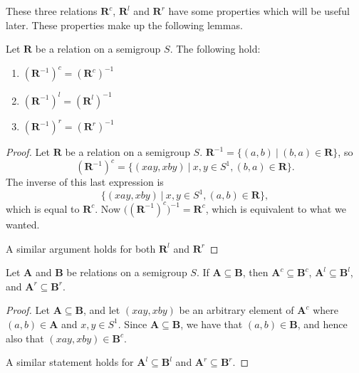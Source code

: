 These three relations $\mathbf{R}^c$, $\mathbf{R}^l$ and $\mathbf{R}^r$ have
some properties which will be useful later.  These properties make up the
following lemmas.

\begin{lemma}
  \label{lem:cinverse}
  Let $\mathbf{R}$ be a relation on a semigroup $S$.
  The following hold:
  \begin{enumerate}[\rm(1)]
  \item $(\mathbf{R}^{-1})^c = (\mathbf{R}^c)^{-1}$
  \item $(\mathbf{R}^{-1})^l = (\mathbf{R}^l)^{-1}$
  \item $(\mathbf{R}^{-1})^r = (\mathbf{R}^r)^{-1}$
  \end{enumerate}
  \begin{proof}
    Let $\mathbf{R}$ be a relation on a semigroup $S$.
    $\mathbf{R}^{-1} = \{(a,b)~|~(b,a)\in\mathbf{R}\}$, so
    $$(\mathbf{R}^{-1})^c = \{(xay,xby)~|~x,y \in S^1, (b,a)\in\mathbf{R}\}.$$
    The inverse of this last expression is
    $$\{(xay,xby)~|~x,y \in S^1, (a,b)\in\mathbf{R}\},$$
    which is equal to $\mathbf{R}^c$.
    Now $\big((\mathbf{R}^{-1})^c\big)^{-1} = \mathbf{R}^c$, which is equivalent
    to what we wanted.

    A similar argument holds for both $\mathbf{R}^l$ and $\mathbf{R}^r$
  \end{proof}
\end{lemma}

\begin{lemma}
  \label{lem:csubset}
  Let $\mathbf{A}$ and $\mathbf{B}$ be relations on a semigroup $S$.  If
  $\mathbf{A} \subseteq \mathbf{B}$, then $\mathbf{A}^c \subseteq \mathbf{B}^c$,
  $\mathbf{A}^l \subseteq \mathbf{B}^l$, and
  $\mathbf{A}^r \subseteq \mathbf{B}^r$.
  \begin{proof}
    Let $\mathbf{A} \subseteq \mathbf{B}$, and let $(xay,xby)$ be an arbitrary
    element of $\mathbf{A}^c$ where $(a,b) \in \mathbf{A}$ and $x,y \in S^1$.
    Since $\mathbf{A} \subseteq \mathbf{B}$, we have that $(a,b) \in
    \mathbf{B}$, and hence also that $(xay,xby) \in \mathbf{B}^c$.

    A similar statement holds for $\mathbf{A}^l \subseteq \mathbf{B}^l$ and
    $\mathbf{A}^r \subseteq \mathbf{B}^r$.
  \end{proof}
\end{lemma}

